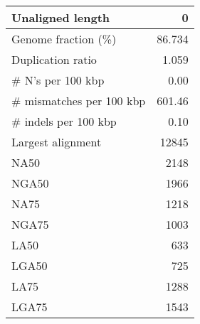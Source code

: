 \documentclass[12pt,a4paper]{article}
\begin{document}
\begin{table}[ht]
\begin{center}
\begin{tabular}{|l*{1}{|r}|}
Unaligned length & 0 \\ \hline
Genome fraction (\%) & 86.734 \\ \hline
Duplication ratio & 1.059 \\ \hline
\# N's per 100 kbp & 0.00 \\ \hline
\# mismatches per 100 kbp & 601.46 \\ \hline
\# indels per 100 kbp & 0.10 \\ \hline
Largest alignment & 12845 \\ \hline
NA50 & 2148 \\ \hline
NGA50 & 1966 \\ \hline
NA75 & 1218 \\ \hline
NGA75 & 1003 \\ \hline
LA50 & 633 \\ \hline
LGA50 & 725 \\ \hline
LA75 & 1288 \\ \hline
LGA75 & 1543 \\ \hline
\end{tabular}
\end{center}
\end{table}
\end{document}
